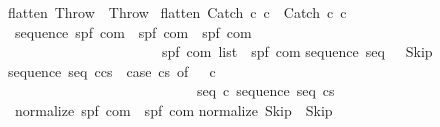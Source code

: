 \begin{isabellebody}
{\isachardoublequoteopen}flatten\ Throw\ {\isacharequal}\ {\isacharbrackleft}Throw{\isacharbrackright}{\isachardoublequoteclose}\ {\isacharbar}\isanewline
{\isachardoublequoteopen}flatten\ {\isacharparenleft}Catch\ c\ c\ {\isacharequal}\ {\isacharbrackleft}Catch\ c\ c\isanewline
\isanewline
{}\isamarkupfalse%
\ sequence{\isacharcolon}{\isacharcolon}\ {\isachardoublequoteopen}{\isacharparenleft}{\isacharparenleft}{\isacharprime}s{\isacharcomma}{\isacharprime}p{\isacharcomma}{\isacharprime}f{\isacharparenright}\ com\ {\isasymRightarrow}\ {\isacharparenleft}{\isacharprime}s{\isacharcomma}{\isacharprime}p{\isacharcomma}{\isacharprime}f{\isacharparenright}\ com\ {\isasymRightarrow}\ {\isacharparenleft}{\isacharprime}s{\isacharcomma}{\isacharprime}p{\isacharcomma}{\isacharprime}f{\isacharparenright}\ com{\isacharparenright}\ {\isasymRightarrow}\ \isanewline
\ \ \ \ \ \ \ \ \ \ \ \ \ \ \ \ \ \ \ \ \ \ {\isacharparenleft}{\isacharprime}s{\isacharcomma}{\isacharprime}p{\isacharcomma}{\isacharprime}f{\isacharparenright}\ com\ list\ {\isasymRightarrow}\ {\isacharparenleft}{\isacharprime}s{\isacharcomma}{\isacharprime}p{\isacharcomma}{\isacharprime}f{\isacharparenright}\ com{\isachardoublequoteclose}\isanewline
{}\isanewline
{\isachardoublequoteopen}sequence\ seq\ {\isacharbrackleft}{\isacharbrackright}\ {\isacharequal}\ Skip{\isachardoublequoteclose}\ {\isacharbar}\isanewline
{\isachardoublequoteopen}sequence\ seq\ {\isacharparenleft}c{\isacharhash}cs{\isacharparenright}\ {\isacharequal}\ {\isacharparenleft}case\ cs\ of\ {\isacharbrackleft}{\isacharbrackright}\ {\isasymRightarrow}\ c\isanewline
\ \ \ \ \ \ \ \ \ \ \ \ \ \ \ \ \ \ \ \ \ \ \ \ {\isacharbar}\ {\isacharunderscore}\ {\isasymRightarrow}\ seq\ c\ {\isacharparenleft}sequence\ seq\ cs{\isacharparenright}{\isacharparenright}{\isachardoublequoteclose}\ \isanewline
\isanewline
\isanewline
{}\isamarkupfalse%
\ normalize{\isacharcolon}{\isacharcolon}\ {\isachardoublequoteopen}{\isacharparenleft}{\isacharprime}s{\isacharcomma}{\isacharprime}p{\isacharcomma}{\isacharprime}f{\isacharparenright}\ com\ {\isasymRightarrow}\ {\isacharparenleft}{\isacharprime}s{\isacharcomma}{\isacharprime}p{\isacharcomma}{\isacharprime}f{\isacharparenright}\ com{\isachardoublequoteclose}\isanewline
{}\isanewline
{\isachardoublequoteopen}normalize\ Skip\ {\isacharequal}\ Skip{\isachardoublequoteclose}\ {\isacharbar}\isanewline

\end{isabellebody}
